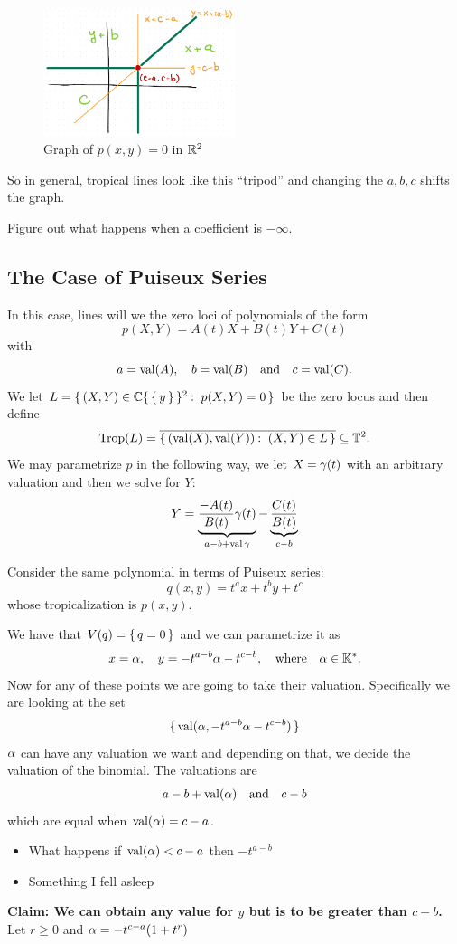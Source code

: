 \documentclass[12pt]{memoir}
\DeclareMathOperator{\val}{val}
\DeclareMathOperator{\Trop}{Trop}
\begin{document}
\begin{figure}[h!]
    \centering
    \includegraphics[width=0.5\textwidth]{figs/fig7-1-TropicalLineExample.png}
    \caption{Graph of $p(x,y)=0$ in $\mathbb{R}^2$}
    \label{fig:7.1-TropicalLineExample}
\end{figure}

So in general, tropical lines look like this ``tripod'' and changing the $a,b,c$ shifts the graph.

\begin{Ej}[2]
Figure out what happens when a coefficient is $-\infty$.
\end{Ej}

\subsection{The Case of Puiseux Series}

In this case, lines will we the zero loci of polynomials of the form 
$$p(X,Y)=A(t)X+B(t)Y+C(t)$$
with 
$$a=\val(A),\quad b=\val(B)\word{and}c=\val(C).$$
We let $L=\set{(X,Y)\in\bC\set{\set{y}}^2\:\ p(X,Y)=0}$ be the zero locus and then define
$$\Trop(L)=\ov{\set{(\val(X),\val(Y))\:\ (X,Y)\in L}}\subseteq\bT^2.$$
We may parametrize $p$ in the following way, we let $X=\gamma(t)$ with an arbitrary valuation and then we solve for $Y$:
$$Y=\underbrace{\frac{-A(t)}{B(t)}\ga(t)}_{a-b+\val\ga}-\underbrace{\frac{C(t)}{B(t)}}_{c-b}$$ 
\begin{Ex}
    Consider the same polynomial in terms of Puiseux series:
    $$q(x,y)=t^ax+t^by+t^c$$
    whose tropicalization is $p(x,y)$. \par 
    We have that $V(q)=\{\,q=0\,\}$ and we can parametrize it as 
    $$x=\alpha,\quad y=-t^{a-b}\alpha-t^{c-b},\quad\text{where}\quad\alpha\in\mathbb{K}^\ast.$$
    Now for any of these points we are going to take their valuation. Specifically we are looking at the set 
    $$\set{\val(\al,-t^{a-b}\al-t^{c-b})}$$
    $\alpha$ can have any valuation we want and depending on that, we decide the valuation of the binomial. The valuations are 
    $$a-b+\val(\al)\word{and}c-b$$
    which are equal when $\val(\al)=c-a$.
    \begin{itemize}
        \item What happens if $\val(\al)<c-a$ then $-t^{a-b}$
        \item Something I fell asleep 
    \end{itemize}
    \textbf{Claim: We can obtain any value for $y$ but is to be greater than $c-b$.}
    Let $r\geq 0$ and $\alpha=-t^{c-a}(1+t^r)$
\end{Ex}
\end{document}
